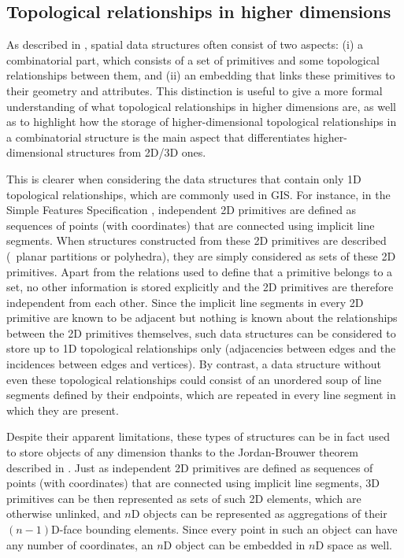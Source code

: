 \subsection{Topological relationships in higher dimensions}
\label{ss:nd-topology}

As described in , spatial data structures often consist of two aspects: (i) a combinatorial part, which consists of a set of primitives and some topological relationships between them, and (ii) an embedding that links these primitives to their geometry and attributes.
This distinction is useful to give a more formal understanding of what topological relationships in higher dimensions are, as well as to highlight how the storage of higher-dimensional topological relationships in a combinatorial structure is the main aspect that differentiates higher-dimensional structures from 2D/3D ones.

This is clearer when considering the data structures that contain only 1D topological relationships, which are commonly used in GIS.\@
For instance, in the Simple Features Specification \citep{SimpleFeatures1}, independent 2D primitives are defined as sequences of points (with coordinates) that are connected using implicit line segments.
When structures constructed from these 2D primitives are described (\eg\ planar partitions or polyhedra), they are simply considered as sets of these 2D primitives.
Apart from the relations used to define that a primitive belongs to a set, no other information is stored explicitly and the 2D primitives are therefore independent from each other.
Since the implicit line segments in every 2D primitive are known to be adjacent but nothing is known about the relationships between the 2D primitives themselves, such data structures can be considered to store up to 1D topological relationships only (adjacencies between edges and the incidences between edges and vertices).
By contrast, a data structure without even these topological relationships could consist of an unordered soup of line segments defined by their endpoints, which are repeated in every line segment in which they are present.

Despite their apparent limitations, these types of structures can be in fact used to store objects of any dimension thanks to the Jordan-Brouwer theorem \citep{Lebesgue11,Brouwer11} described in .
Just as independent 2D primitives are defined as sequences of points (with coordinates) that are connected using implicit line segments, 3D primitives can be then represented as sets of such 2D elements, which are otherwise unlinked, and $n$D objects can be represented as aggregations of their $(n-1)$D-face bounding elements.
Since every point in such an object can have any number of coordinates, an $n$D object can be embedded in $n$D space as well.

